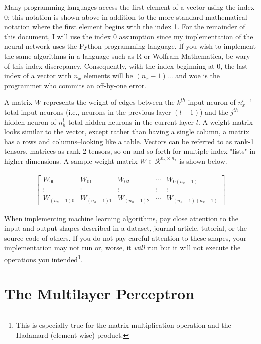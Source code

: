 \documentclass{article}
\begin{document}
Many programming languages access the first element of a vector using the index
0; this notation is shown above in addition to the more standard
mathematical notation where the first element begins with the index 1.
For the remainder of this document, I will use the index 0 assumption
since my implementation of the neural network uses the Python
programming language. If you wish to implement the same algorithms in a language
such as R or Wolfram Mathematica, be wary of this index discrepancy.
Consequently, with the index beginning at 0, the last index of a vector with
$n_x$ elements will be $(n_x - 1)$... and woe is the programmer who commits an
off-by-one error.

A matrix $W$ represents the weight of edges between the $k^{th}$
input neuron of $n_x^{l-1}$ total input neurons (i.e., neurons in the previous layer $(l-1)$)
and the $j^{th}$ hidden neuron of $n_h^{l}$ total hidden neurons in the current layer $l$.
A weight matrix looks similar to the vector, except rather than having a single
column, a matrix has a rows and columns--looking like a table. Vectors can
be referred to as rank-1 tensors, matrices as rank-2 tensors, so-on and so-forth
for multiple index "lists" in higher dimensions. A sample weight matrix
$W \in \mathcal{R}^{n_h \times n_x}$ is shown below.

\begin{align}
	\begin{bmatrix}
		W_{00}         & W_{01}         & W_{02}         & \cdots & W_{0(n_{x}-1)}         \\
		\vdots         & \vdots         & \vdots         & \vdots & \vdots                 \\
		W_{(n_{h}-1)0} & W_{(n_{h}-1)1} & W_{(n_{h}-1)2} & \cdots & W_{(n_{h}-1)(n_{x}-1)}
	\end{bmatrix}
\end{align}

When implementing machine learning algorithms, pay close attention to the
input and output shapes described in a dataset, journal article, tutorial, or
the source code of others. If you do not pay careful attention to these shapes,
your implementation may not run or, worse, it \textit{will} run but it will not execute
the operations you intended\footnote{This is especially true for the
	matrix multiplication operation and the Hadamard (element-wise) product.}.

\section{The Multilayer Perceptron}
\end{document}
